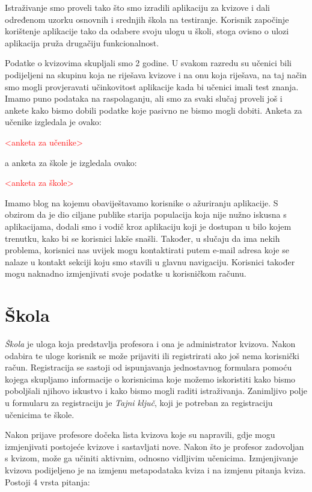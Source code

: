 \documentclass{scrreprt}
\begin{document}
Istraživanje smo proveli tako što smo izradili aplikaciju za kvizove i dali
određenom uzorku osnovnih i srednjih škola na testiranje. Korisnik započinje
korištenje aplikacije tako da odabere svoju ulogu u školi, stoga ovisno o ulozi
aplikacija pruža drugačiju funkcionalnost.

Podatke o kvizovima skupljali smo 2 godine. U svakom razredu su učenici bili
podijeljeni na skupinu koja ne riješava kvizove i na onu koja riješava, na taj
način smo mogli provjeravati učinkovitost aplikacije kada bi učenici imali test
znanja. Imamo puno podataka na raspolaganju, ali smo za svaki slučaj proveli još
i ankete kako bismo dobili podatke koje pasivno ne bismo mogli dobiti. Anketa za
učenike izgledala je ovako:

\textcolor{red}{<anketa za učenike>}

a anketa za škole je izgledala ovako:

\textcolor{red}{<anketa za škole>}

Imamo blog na kojemu obaviještavamo korisnike o ažuriranju aplikacije. S obzirom
da je dio ciljane publike starija populacija koja nije nužno iskusna s
aplikacijama, dodali smo i vodič kroz aplikaciju koji je dostupan u bilo kojem
trenutku, kako bi se korisnici lakše snašli. Također, u slučaju da ima nekih
problema, korisnici nas uvijek mogu kontaktirati putem e-mail adresa koje se
nalaze u kontakt sekciji koju smo stavili u glavnu navigaciju. Korisnici također
mogu naknadno izmjenjivati svoje podatke u korisničkom računu.

\section{Škola}

\emph{Škola} je uloga koja predstavlja profesora i ona je administrator kvizova.
Nakon odabira te uloge korisnik se može prijaviti ili registrirati ako još nema
korisnički račun. Registracija se sastoji od ispunjavanja jednostavnog formulara
pomoću kojega skupljamo informacije o korisnicima koje možemo iskoristiti kako
bismo poboljšali njihovo iskustvo i kako bismo mogli raditi istraživanja.
Zanimljivo polje u formularu za registraciju je \emph{Tajni ključ}, koji je
potreban za registraciju učenicima te škole.

Nakon prijave profesore dočeka lista kvizova koje su napravili, gdje mogu
izmjenjivati postojeće kvizove i sastavljati nove. Nakon što je profesor
zadovoljan s kvizom, može ga učiniti aktivnim, odnosno vidljivim učenicima.
Izmjenjivanje kvizova podijeljeno je na izmjenu metapodataka kviza i na izmjenu
pitanja kviza. Postoji 4 vrsta pitanja:
\end{document}
